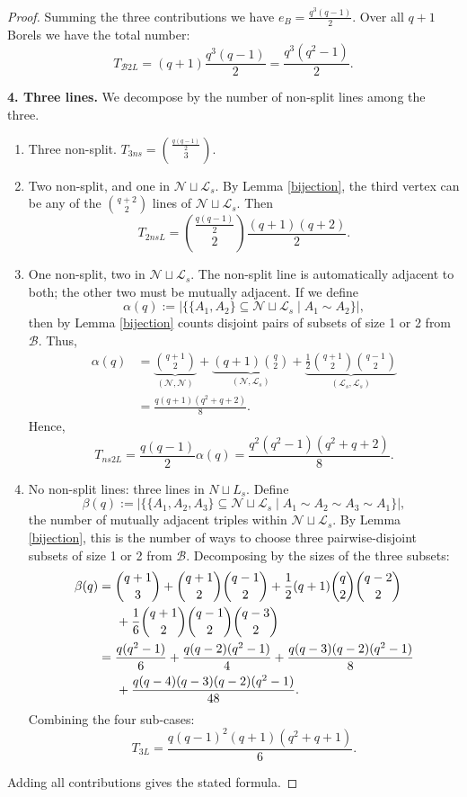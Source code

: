 \documentclass[11pt]{amsart}
\theoremstyle{plain}
\begin{document}
\begin{proof}
Summing the three contributions we have $e_B = \frac{q^{3}(q-1)}{2}$. Over all $q+1$ Borels we have the total number:
\[T_{\mathcal{B}2L}=(q+1) \frac{q^{3}(q-1)}{2} = \frac{q^{3}(q^2-1)}{2}.\]

\noindent\textbf{4. Three lines.}
We decompose by the number of non-split lines among the three.
\begin{enumerate}
\item[(i)] Three non-split. $T_{3ns}=\binom{\frac{q(q-1)}{2}}{3}$.

\item[(ii)] Two non-split, and one in $\mathcal{N}\sqcup \mathcal{L}_s$. By Lemma \ref{bijection}, the third vertex can be any of the $\binom{q+2}{2}$ lines of $\mathcal{N}\sqcup \mathcal{L}_s$. Then 
\[T_{2nsL} = \binom{\tfrac{q(q-1)}{2}}{2} \frac{(q+1)(q+2)}{2}.\]

\item[(iii)] One non-split, two in $\mathcal{N}\sqcup \mathcal{L}_s$.
The non-split line is automatically adjacent to both; the other two
must be mutually adjacent. If we define
\[\alpha(q) := |\{\{A_1,A_2\}\subseteq \mathcal{N}\sqcup \mathcal{L}_s \mid A_1\sim A_2\}|,\]
then by Lemma \ref{bijection} counts disjoint pairs of subsets of size 1 or 2 from $\mathcal{B}$. Thus, 
\begin{align*}
\alpha(q) & = \underbrace{\binom{q+1}{2}}_{(\mathcal{N},\mathcal{N})}   + \underbrace{(q+1)\binom{q}{2}}_{(\mathcal{N},\mathcal{L}_s)} + \underbrace{\tfrac{1}{2} \binom{q+1}{2} \binom{q-1}{2}}_{(\mathcal{L}_s, \mathcal{L}_s)}\\ 
& =\frac{q(q+1)(q^2+q+2)}{8}.
\end{align*}
Hence,
\[T_{ns2L} = \frac{q(q-1)}{2} \alpha(q) = \frac{q^2(q^2-1)(q^2+q+2)}{8}.\]

\item[(iii)] No non-split lines: three lines in $N\sqcup L_s$.
Define
\[\beta(q) := |\{\{A_1,A_2,A_{3}\}\subseteq \mathcal{N}\sqcup \mathcal{L}_s\mid A_1 \sim A_2 \sim A_3 \sim A_1\}|,\]
the number of mutually adjacent triples within $\mathcal{N}\sqcup \mathcal{L}_s$.  By Lemma \ref{bijection}, this is the number of ways to choose three pairwise-disjoint subsets of size 1 or 2 from $\mathcal{B}$.  Decomposing by the sizes of the three subsets:
\begin{align*}
\beta(q) & = \binom{q+1}{3} + \binom{q+1}{2}\binom{q-1}{2} + \frac{1}{2} (q+1) \binom{q}{2} \binom{q-2}{2} \\
& \hskip0.5cm + \frac{1}{6} \binom{q+1}{2} \binom{q-1}{2} \binom{q-3}{2}\\
& = \frac{q(q^2-1)}{6} + \frac{q(q-2)(q^2-1)}{4} + \frac{q(q-3)(q-2)(q^2-1)}{8}\\ & \hskip0.5cm +\frac{q(q-4)(q-3)(q-2)(q^2-1)}{48}.
\end{align*}
Combining the four sub-cases:
\[T_{3L} = \frac{q(q-1)^2(q+1)(q^2+q+1)}{6}.\]
\end{enumerate}
Adding all contributions gives the stated formula.
\end{proof}
\end{document}
